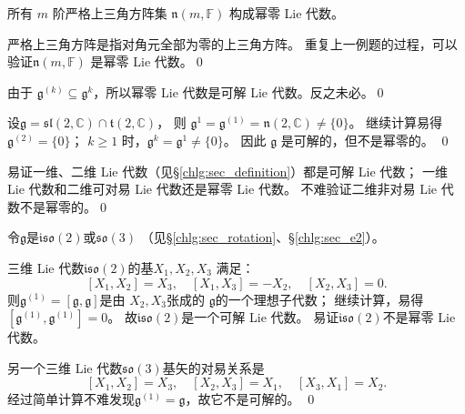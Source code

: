 \begin{example}
    所有 $m$ 阶严格上三角方阵集 $\mathfrak{n}(m, \mathbb{F})$ 构成幂零 Lie 代数。
\end{example}
严格上三角方阵是指对角元全部为零的上三角方阵。
重复上一例题的过程，可以验证$\mathfrak{n}(m, \mathbb{F})$ 是幂零 Lie 代数。\qed

\begin{example}
    由于 $\mathfrak{g}^{(k)} \subseteq \mathfrak{g}^k$，所以幂零 Lie 代数是可解 Lie 代数。反之未必。\qed
\end{example}

\begin{example}
    设$\mathfrak{g}=\mathfrak{sl}(2, \mathbb{C}) \cap \mathfrak{t}(2, \mathbb{C})$，
    则 $\mathfrak{g}^1=\mathfrak{g}^{(1)}=\mathfrak{n}(2, \mathbb{C}) \neq\{0\}$。
    继续计算易得 $\mathfrak{g}^{(2)}=\{0\}$；
    $k \geqslant 1$ 时，$\mathfrak{g}^k=\mathfrak{g}^1 \neq\{0\}$。
    因此 $\mathfrak{g}$ 是可解的，但不是幂零的。 \qed
\end{example}

\begin{example}
    易证一维、二维 Lie 代数（见\S\ref{chlg:sec_definition}）都是可解 Lie 代数；
    一维 Lie 代数和二维可对易 Lie 代数还是幂零 Lie 代数。
    不难验证二维非对易 Lie 代数不是幂零的。\qed
\end{example}

\begin{example}
    令$\mathfrak{g}$是$\mathfrak{iso}(2)$或$\mathfrak{so}(3)$
    （见\S\ref{chlg:sec_rotation}、\S\ref{chlg:sec_e2}）。
\end{example}
三维 Lie 代数$\mathfrak{iso}(2)$的基$X_1, X_2, X_3$ 满足：
\begin{equation*}
    \left[X_1, X_2\right]=X_3,\quad \left[X_1, X_3\right]=-X_2,\quad \left[X_2, X_3\right]=0.
\end{equation*}
则$\mathfrak{g}^{(1)}=[\mathfrak{g}, \mathfrak{g}]$是由 $X_2, X_3$张成的
$\mathfrak{g}$的一个理想子代数；
继续计算，易得$\left[\mathfrak{g}^{(1)}, \mathfrak{g}^{(1)}\right]=0$。
故$\mathfrak{iso}(2)$是一个可解 Lie 代数。
易证$\mathfrak{iso}(2)$不是幂零 Lie 代数。

另一个三维 Lie 代数$\mathfrak{so}(3)$基矢的对易关系是
\begin{equation*}
    \left[X_1, X_2\right]=X_3,\quad \left[X_2, X_3\right]=X_1,\quad \left[X_3, X_1\right]=X_2 .
\end{equation*}
经过简单计算不难发现$\mathfrak{g}^{(1)}=\mathfrak{g}$，故它不是可解的。 \qed

